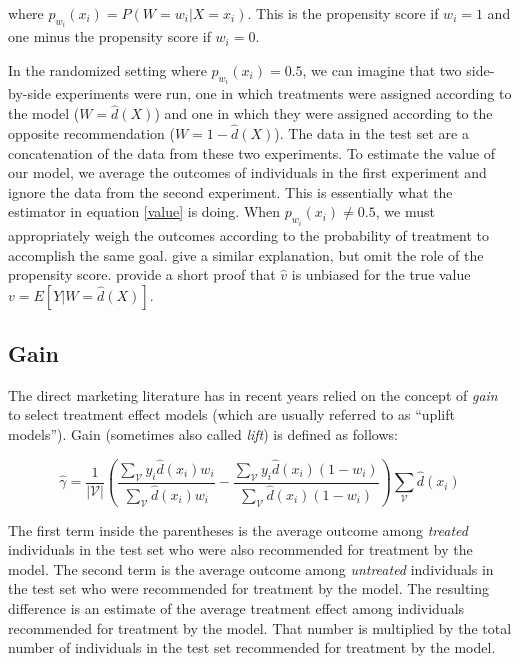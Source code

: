 where $p_{w_i}(x_i) = P(W=w_i | X=x_i)$. This is the propensity score if $w_i = 1$ and one minus the propensity score if $w_i = 0$.

In the randomized setting where $p_{w_i}(x_i) = 0.5$, we can imagine that two side-by-side experiments were run, one in which treatments were assigned according to the model ($W = \hat d(X)$) and one in which they were assigned according to the opposite recommendation ($W = 1 - \hat d(X)$). The data in the test set are a concatenation of the data from these two experiments. To estimate the value of our model, we average the outcomes of individuals in the first experiment and ignore the data from the second experiment. This is essentially what the estimator in equation \ref{value} is doing. When $p_{w_i}(x_i) \ne 0.5$, we must appropriately weigh the outcomes according to the probability of treatment to accomplish the same goal. \citet{Kapelner:3baXYEjR} give a similar explanation, but omit the role of the propensity score. \citet{Zhao:2017wa} provide a short proof that $\hat v$ is unbiased for the true value $v = E[Y|W = \hat d(X)]$. 


\subsection{Gain}

The direct marketing literature has in recent years relied on the concept of \emph{gain} to select treatment effect models (which are usually referred to as ``uplift models''). Gain (sometimes also called \emph{lift}) is defined as follows:

\begin{equation}
\label{gain-basic}
	\hat \gamma = \frac{1}{|\mathcal V |} \left(
		  \frac{\sum_{\mathcal{V}} y_i  \hat d(x_i) w_i}{\sum_{\mathcal{V}}  \hat d(x_i) w_i} - 
		  \frac{\sum_{\mathcal{V}} y_i  \hat d(x_i) (1-w_i)}{\sum_{\mathcal{V}}  \hat d(x_i)  (1-w_i)} 
		  \right)
		  \sum_{\mathcal{V}} \hat d(x_i) 
\end{equation}

The first term inside the parentheses is the average outcome among \emph{treated} individuals in the test set who were also recommended for treatment by the model. The second term is the average outcome among \emph{untreated} individuals in the test set who were recommended for treatment by the model. The resulting difference is an estimate of the average treatment effect among individuals recommended for treatment by the model. That number is multiplied by the total number of individuals in the test set recommended for treatment by the model. 

